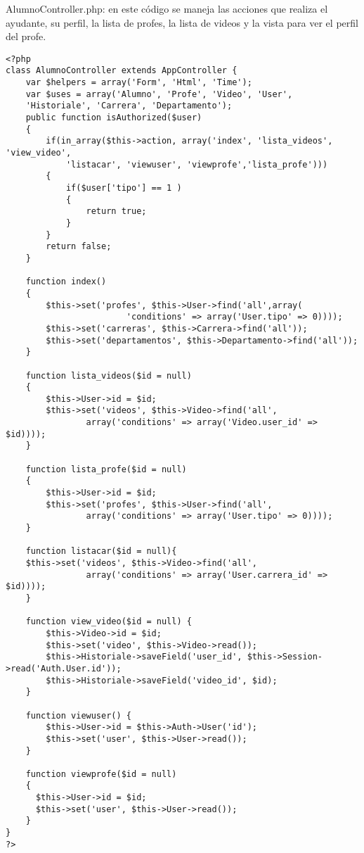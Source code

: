 \documentclass[12pt]{article}
\begin{document}
AlumnoController.php: en este código se maneja las acciones que realiza el ayudante, su perfil, 
la lista de profes, la lista de videos y la vista para ver el perfil del profe. \\
\footnotesize
\begin{verbatim}
<?php
class AlumnoController extends AppController {
	var $helpers = array('Form', 'Html', 'Time');
	var $uses = array('Alumno', 'Profe', 'Video', 'User', 
	'Historiale', 'Carrera', 'Departamento');
	public function isAuthorized($user)
	{
		if(in_array($this->action, array('index', 'lista_videos', 'view_video',
			'listacar', 'viewuser', 'viewprofe','lista_profe'))) 
		{
			if($user['tipo'] == 1 )
			{
				return true;
			}
		}
		return false;
	}

	function index() 
	{
		$this->set('profes', $this->User->find('all',array(
						'conditions' => array('User.tipo' => 0))));
		$this->set('carreras', $this->Carrera->find('all'));
		$this->set('departamentos', $this->Departamento->find('all'));
	}

	function lista_videos($id = null)
	{
		$this->User->id = $id;
		$this->set('videos', $this->Video->find('all', 
				array('conditions' => array('Video.user_id' => $id))));	
	}

	function lista_profe($id = null)
	{
		$this->User->id = $id;
		$this->set('profes', $this->User->find('all',
				array('conditions' => array('User.tipo' => 0))));	
	}

	function listacar($id = null){
	$this->set('videos', $this->Video->find('all', 
				array('conditions' => array('User.carrera_id' => $id))));	
	}

	function view_video($id = null) {
		$this->Video->id = $id;
		$this->set('video', $this->Video->read());
		$this->Historiale->saveField('user_id', $this->Session->read('Auth.User.id'));
		$this->Historiale->saveField('video_id', $id);
	}

	function viewuser() {
		$this->User->id = $this->Auth->User('id');
		$this->set('user', $this->User->read());
	}

	function viewprofe($id = null)
	{
	  $this->User->id = $id;
      $this->set('user', $this->User->read());
	}
}
?>
\end{verbatim}
\end{document}
